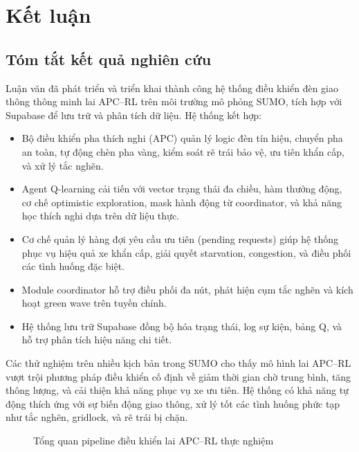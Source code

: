 \chapter{Kết luận}

\section{Tóm tắt kết quả nghiên cứu}

Luận văn đã phát triển và triển khai thành công hệ thống điều khiển đèn giao thông thông minh lai APC–RL trên môi trường mô phỏng SUMO, tích hợp với Supabase để lưu trữ và phân tích dữ liệu. Hệ thống kết hợp:

\begin{itemize}
    \item Bộ điều khiển pha thích nghi (APC) quản lý logic đèn tín hiệu, chuyển pha an toàn, tự động chèn pha vàng, kiểm soát rẽ trái bảo vệ, ưu tiên khẩn cấp, và xử lý tắc nghẽn.
    \item Agent Q-learning cải tiến với vector trạng thái đa chiều, hàm thưởng động, cơ chế optimistic exploration, mask hành động từ coordinator, và khả năng học thích nghi dựa trên dữ liệu thực.
    \item Cơ chế quản lý hàng đợi yêu cầu ưu tiên (pending requests) giúp hệ thống phục vụ hiệu quả xe khẩn cấp, giải quyết starvation, congestion, và điều phối các tình huống đặc biệt.
    \item Module coordinator hỗ trợ điều phối đa nút, phát hiện cụm tắc nghẽn và kích hoạt green wave trên tuyến chính.
    \item Hệ thống lưu trữ Supabase đồng bộ hóa trạng thái, log sự kiện, bảng Q, và hỗ trợ phân tích hiệu năng chi tiết.
\end{itemize}

Các thử nghiệm trên nhiều kịch bản trong SUMO cho thấy mô hình lai APC–RL vượt trội phương pháp điều khiển cố định về giảm thời gian chờ trung bình, tăng thông lượng, và cải thiện khả năng phục vụ xe ưu tiên. Hệ thống có khả năng tự động thích ứng với sự biến động giao thông, xử lý tốt các tình huống phức tạp như tắc nghẽn, gridlock, và rẽ trái bị chặn.

\begin{figure}[H]
    \centering
    \caption{Tổng quan pipeline điều khiển lai APC–RL thực nghiệm}
\end{figure}

